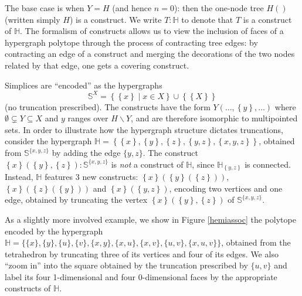 \documentclass[10pt]{amsart}
\theoremstyle{definition}
\theoremstyle{remark}
\numberwithin{equation}{section}
\newcommand{\set}[1]{\left\{#1\right\}}
\newcommand{\0}{\color{blue}{\mathsf{0}}}
\newcommand{\inc}{\subseteq}
\newcommand{\incs}{\subsetneq}
\newcommand{\union}{\cup}
\newcommand{\setc}[2]{\set{#1 \mid #2}}
\newcommand{\hyper}[1]{{\mathbb #1}}
\begin{document}
\smallskip
 The base case is when $Y=H$ (and hence $n=0$): then the one-node tree $H()$ (written simply $H$) is a construct.
We write $T:\hyper{H}$ to denote that $T$ is a construct of $\hyper{H}$. 
The formalism of constructs   allows us to view the inclusion of faces of a hypergraph polytope through the process of contracting tree edges: by contracting an edge of a construct and  merging the decorations of the two nodes related by that edge, one gets a covering construct.

\smallskip
Simplices are ``encoded'' as the hypergraphs  $$\hyper{S}^X=\setc{\set{x}}{x\in X}\union\set{\set{X}}$$ (no truncation prescribed). The constructs have the form $Y(\ldots,\set{y},\ldots)$ where $\emptyset\incs Y\inc X$ and $y$ ranges over $H\backslash Y$, and are therefore isomorphic to multipointed sets. In order to illustrate  how the hypergraph structure dictates truncations, consider the hypergraph $\hyper{H}=\set{\set{x},\set{y},\set{z},\set{y,z}, \set{x,y,z}}$, obtained from $\hyper{S}^{\{x,y,z\}}$ by adding the edge $\{y,z\}$. The construct 
 $\set{x}(\set{y},\set{z}):\hyper{S}^{\{x,y,z\}}$ is {\em not} a construct of $\hyper{H}$, since $\hyper{H}_{\set{y,z}}$ is connected.  Instead, $\hyper{H}$ features 3 new constructs: 
$\set{x}(\set{y}(\set{z}))$, $\set{x}(\set{z}(\set{y}))$ and $\set{x}(\set{y,z})$, encoding two  vertices and one edge, obtained by truncating  the vertex $\set{x}(\set{y},\set{z})$ of $\hyper{S}^{\{x,y,z\}}$.

As a slightly more involved example, we show in Figure \ref{hemiassoc} the polytope encoded by the hypergraph $\hyper{H}=\{\{x\},\{y\},\{u\},\{v\},\{x,y\},\{x,u\},\{x,v\},\{u,v\},\{x,u,v\}\}$, obtained from the  tetrahedron by truncating three of its vertices and four of its edges. We also ``zoom in'' into the square obtained by the truncation prescribed by $\{u,v\}$  and label its four 1-dimensional and four 0-dimensional faces by the appropriate constructs of $\hyper{H}$. 
\end{document}
